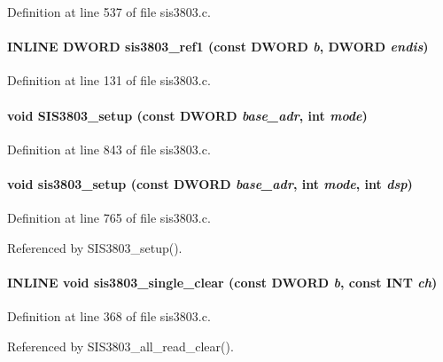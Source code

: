 Definition at line 537 of file sis3803.c.
\paragraph[{sis3803\_\-ref1}]{\setlength{\rightskip}{0pt plus 5cm}INLINE {\bf DWORD} sis3803\_\-ref1 (const {\bf DWORD} {\em b}, \/  {\bf DWORD} {\em endis})}\hfill\label{sis3803_8h_a41eafd47b3379c1842243503c5c1d432}


Definition at line 131 of file sis3803.c.
\paragraph[{SIS3803\_\-setup}]{\setlength{\rightskip}{0pt plus 5cm}void SIS3803\_\-setup (const {\bf DWORD} {\em base\_\-adr}, \/  int {\em mode})}\hfill\label{sis3803_8h_a994abee2e8eaa3cf9d647e566e07d620}


Definition at line 843 of file sis3803.c.
\paragraph[{sis3803\_\-setup}]{\setlength{\rightskip}{0pt plus 5cm}void sis3803\_\-setup (const {\bf DWORD} {\em base\_\-adr}, \/  int {\em mode}, \/  int {\em dsp})}\hfill\label{sis3803_8h_a6e19934f414b53c9d6da8541b0d871e7}


Definition at line 765 of file sis3803.c.

Referenced by SIS3803\_\-setup().
\paragraph[{sis3803\_\-single\_\-clear}]{\setlength{\rightskip}{0pt plus 5cm}INLINE void sis3803\_\-single\_\-clear (const {\bf DWORD} {\em b}, \/  const {\bf INT} {\em ch})}\hfill\label{sis3803_8h_ae7dc912463732422b8892106f1e10da1}


Definition at line 368 of file sis3803.c.

Referenced by SIS3803\_\-all\_\-read\_\-clear().
